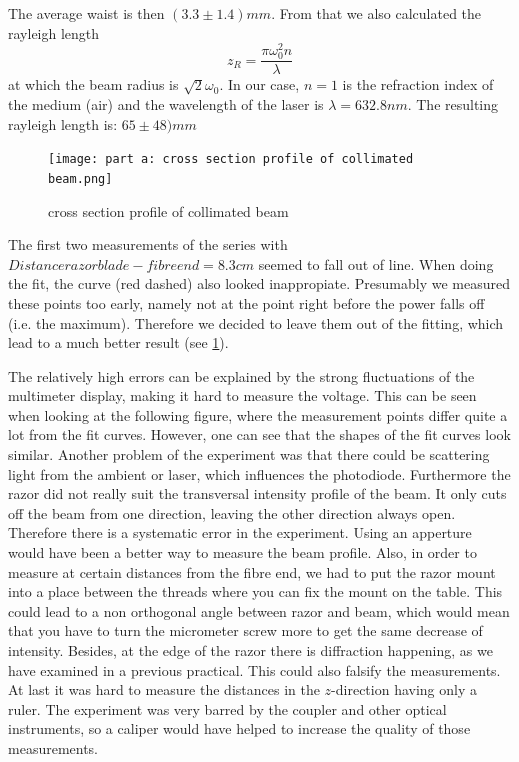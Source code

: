 \documentclass{article}
\begin{document}
 The average waist is then $(3.3\pm 1.4) mm$. From that we also calculated the rayleigh length 
\begin{equation}
z_{R} = \frac{\pi\omega_{0}^2 n}{\lambda} 
\label{rayleighlength}
\end{equation}
at which the beam radius is $\sqrt{2}\omega_{0}$. In our case, $n=1$ is the refraction index of the medium (air) and the wavelength of the laser is $\lambda =632.8 nm$. The resulting rayleigh length is:
$65 \pm 48) mm$\\

\begin{figure}
\texttt{[image: part a: cross section profile of collimated beam.png]}
\caption{cross section profile of collimated beam}
\label{part_a_fig} %
\end{figure}

The first two measurements of the series with $Distance razor blade - fibre end = 8.3 cm$ seemed to fall out of line. When doing the fit, the curve (red dashed) also looked inappropiate. Presumably we measured these points too early, namely not at the point right before the power falls off (i.e. the maximum). Therefore we decided to leave them out of the fitting, which lead to a much better result (see \ref{part_a_fig}).

The relatively high errors can be explained by the strong fluctuations of the multimeter display, making it hard to measure the voltage. This can be seen when looking at the following figure, where the measurement points differ quite a lot from the fit curves. However, one can see that the shapes of the fit curves look similar. Another problem of the experiment was that there could be scattering light from the ambient or laser, which influences the photodiode. Furthermore the razor did not really suit the transversal intensity profile of the beam. It only cuts off the beam from one direction, leaving the other direction always open. Therefore there is a systematic error in the experiment. Using an apperture would have been a better way to measure the beam profile. Also, in order to measure at certain distances from the fibre end, we had to put the razor mount into a place between the threads where you can fix the mount on the table. This could lead to a non orthogonal angle between razor and beam, which would mean that you have to turn the micrometer screw more to get the same decrease of intensity. Besides, at the edge of the razor there is diffraction happening, as we have examined in a previous practical. This could also falsify the measurements. At last it was hard to measure the distances in the $z$-direction having only a ruler. The experiment was very barred by the coupler and other optical instruments, so a caliper would have helped to increase the quality of those measurements.
\end{document}
